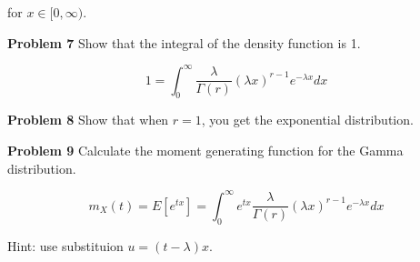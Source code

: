 \documentclass[]{article}
\begin{document}
for $x \in [0, \infty)$.

\textbf{Problem 7} Show that the integral of the 
density function is 1.

$$
1 = \int_0^{\infty} \frac{\lambda}{\Gamma(r)} 
                  (\lambda x)^{r-1} e^{-\lambda x} dx
$$

\textbf{Problem 8} Show that when $r = 1$, you get the 
exponential distribution.

\textbf{Problem 9} Calculate the moment generating function
for the Gamma distribution.

$$
m_X(t) = E\left[ e^{tx} \right] = \int_0^{\infty}  e^{tx} 
    \frac{\lambda}{\Gamma(r)}   (\lambda x)^{r-1} e^{-\lambda x} dx
$$

Hint: use substituion $u=(t-\lambda)x$.
\end{document}
